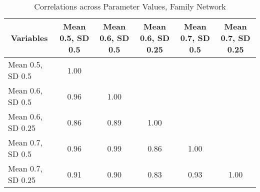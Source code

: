 \begin{table}[htbp]\centering \caption{Correlations across Parameter Values, Family Network\label{corr_family}}
\begin{tabular}{l  c  c  c  c  c }\hline\hline
\multicolumn{1}{c}{Variables} &Mean 0.5, SD 0.5&Mean 0.6, SD 0.5&Mean 0.6, SD 0.25&Mean 0.7, SD 0.5&Mean 0.7, SD 0.25\\ \hline
Mean 0.5, SD 0.5&1.00\\
Mean 0.6, SD 0.5&0.96&1.00\\
Mean 0.6, SD 0.25&0.86&0.89&1.00\\
Mean 0.7, SD 0.5&0.96&0.99&0.86&1.00\\
Mean 0.7, SD 0.25&0.91&0.90&0.83&0.93&1.00\\
\hline \hline 
 \end{tabular}
\end{table}
